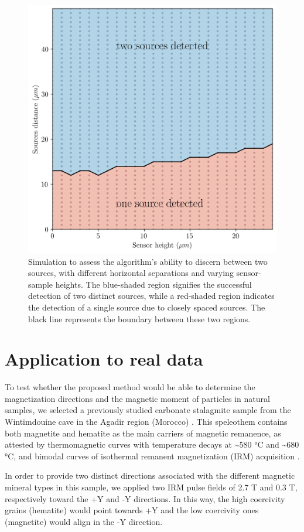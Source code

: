 \begin{figure}[tb!]
\centering
\includegraphics[width=0.5\linewidth]{figures/detection-map.png}
\caption{
Simulation to assess the algorithm's ability to discern between two sources, with different horizontal separations and varying sensor-sample heights. The blue-shaded region signifies the successful detection of two distinct sources, while a red-shaded region indicates the detection of a single source due to closely spaced sources. The black line represents the boundary between these two regions.
}
\label{detection-map}
\end{figure}

\section{Application to real data}

To test whether the proposed method would be able to determine the
magnetization directions and the magnetic moment of particles in natural
samples, we selected a previously studied carbonate stalagmite sample from the
Wintimdouine cave in the Agadir region (Morocco) \citep{Ait2019Hydro}. This
speleothem contains both magnetite and hematite as the main carriers of
magnetic remanence, as attested by thermomagnetic curves with temperature
decays at {\textasciitilde}580 °C and {\textasciitilde}680 °C, and bimodal
curves of isothermal remanent magnetization (IRM) acquisition \citep{carmo2019speleothem}.

In order to provide two distinct directions associated with the different
magnetic mineral types in this sample, we applied two IRM pulse fields of 2.7 T
and 0.3 T, respectively toward the +Y and -Y directions. In this way, the high
coercivity grains (hematite) would point towards +Y and the low coercivity ones
(magnetite) would align in the -Y direction.

